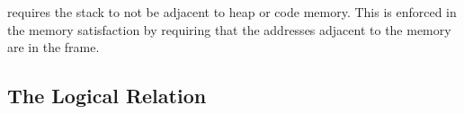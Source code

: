 \begin{jversion}
\stktokens{} requires the stack to not be adjacent to heap or code memory.
This is enforced in the memory satisfaction by requiring that the addresses adjacent to the memory are in the frame.

\end{jversion}


\subsection{The Logical Relation}
